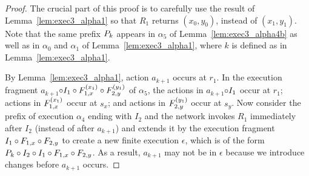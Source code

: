 \begin{proof}
The crucial part of this proof is to carefully use the result of  Lemma~\ref{lem:exec3_alpha1} so that $R_1$ returns $(x_0, y_0)$, instead of $(x_1, y_1)$.
Note that the same prefix $\finiteprefixA{k-1}{k}$ appears in $\alpha_5$ of Lemma~\ref{lem:exec3_alpha4b} as well as in $\alpha_0$ and $\alpha_1$ of Lemma~\ref{lem:exec3_alpha1}, where
 $k$ is defined as in Lemma~\ref{lem:exec3_alpha1}.

By Lemma~\ref{lem:exec3_alpha1}, action $a_{k+1}$ occurs at $r_1$.
 In the execution fragment 
 $a_{k+1} $$ \circ \fragt{I_1}{\alpha_5}{}
\circ \fragt{F_{1,x}}{\alpha_5}{x_1} \circ \fragt{F_{2,y}}{\alpha_5}{y_1}$ of $\alpha_5$, the actions in
 $a_{k+1} $$ \circ \fragt{I_1}{\alpha_4}{}$ occur at $r_1$; actions in 
$\fragt{F_{1,x}}{\alpha_4}{x_1}$ occur at $s_x$; and  actions in $\fragt{F_{2,y}}{\alpha_4}{y_1}$ occur at $s_y$. 
Now consider the  prefix of execution $\alpha_4$ ending with $I_2$ and the network invokes $R_1$ immediately after $I_2$  (instead of 
after $a_{k+1}$) and  extends it by the execution fragment  $ \fragt{I_1}{\epsilon}{} \circ \fragt{F_{1,x}}{\epsilon}{} \circ  \fragt{F_{2,y}}{\epsilon}{}$ to create a new finite execution $\epsilon$, which is of the form $\finiteprefixA{k-1}{k}  \circ \fragt{I_2}{\epsilon}{} \circ \fragt{I_1}{\epsilon}{} \circ \fragt{F_{1,x}}{\epsilon}{} \circ  \fragt{F_{2,y}}{\epsilon}{}$. As a result, $a_{k+1}$ may not be in $\epsilon$ because we introduce changes before $a_{k+1}$ occurs.


\end{proof}
